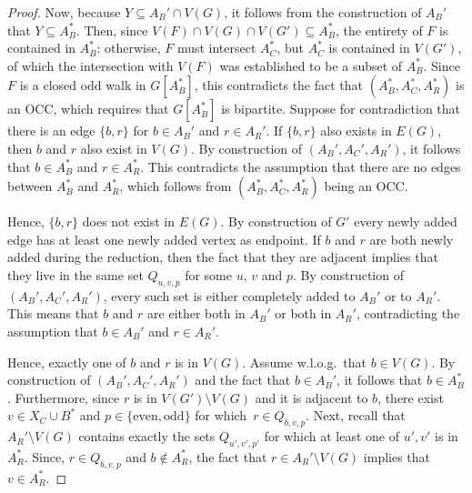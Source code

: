\begin{proof}
	Now, because $Y \subseteq A_B' \cap V(G)$, it follows from the construction of $A_B'$ that $Y \subseteq A_B^\ast$. Then, since $V(F) \cap V(G) \cap V(G') \subseteq A_B^\ast$, the entirety of $F$ is contained in $A_B^\ast$: otherwise, $F$ must intersect $A_C^\ast$, but $A_C^\ast$ is contained in $V(G')$, of which the intersection with $V(F)$ was established to be a subset of $A_B^\ast$. Since $F$ is a closed odd walk in $G[A_B^\ast]$, this contradicts the fact that $(A_B^\ast, A_C^\ast, A_R^\ast)$ is an OCC, which requires that $G[A_B^\ast]$ is bipartite.
	 Suppose for contradiction that there is an edge $\{b, r\}$ for $b \in A_B'$ and $r \in A_R'$. If $\{b, r\}$ also exists in $E(G)$, then $b$ and $r$ also exist in $V(G)$. By construction of $(A_B', A_C', A_R')$, it follows that $b \in A_B^\ast$ and $r \in A_R^\ast$. This contradicts the assumption that there are no edges between $A_B^\ast$ and $A_R^\ast$, which follows from $(A_B^\ast, A_C^\ast, A_R^\ast)$ being an OCC.
	
	Hence, $\{b, r\}$ does not exist in $E(G)$. By construction of $G'$ every newly added edge has at least one newly added vertex as endpoint. If $b$ and $r$ are both newly added during the reduction, then the fact that they are adjacent implies that they live in the same set $Q_{u,v,p}$ for some $u$, $v$ and $p$. By construction of $(A_B', A_C', A_R')$, every such set is either completely added to $A_B'$ or to $A_R'$. This means that $b$ and $r$ are either both in $A_B'$ or both in $A_R'$, contradicting the assumption that $b \in A_B'$ and $r \in A_R'$.
	
	Hence, exactly one of $b$ and $r$ is in $V(G)$. Assume w.l.o.g.~that $b \in V(G)$. By construction of $(A_B', A_C', A_R')$ and the fact that $b \in A_B'$, it follows that $b \in A_B^\ast$. Furthermore, since $r$ is in $V(G') \setminus V(G)$ and it is adjacent to $b$, there exist $v \in X_C \cup B^\ast$ and $p \in \{\text{even}, \text{odd}\}$ for which~$r \in Q_{b,v,p}$. Next, recall that $A_R' \setminus V(G)$ contains exactly the sets $Q_{u', v', p'}$ for which at least one of $u', v'$ is in $A_R^\ast$. Since, $r \in Q_{b,v,p}$ and $b \notin A_R^\ast$, the fact that $r \in A_R' \setminus V(G)$ implies that~$v \in A_R^\ast$.
	

\end{proof}
